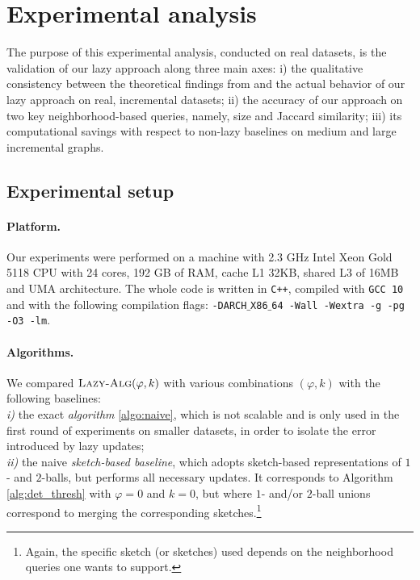 \section{Experimental analysis}\label{sec:exp}
The purpose of this experimental analysis, conducted on real datasets, is the validation of our lazy approach along three main axes: i) the qualitative consistency between the theoretical findings from  and the actual behavior of our lazy approach on real, incremental datasets;
ii) the accuracy of our approach on two key neighborhood-based queries, namely, size and Jaccard similarity;  iii) its computational savings with respect to non-lazy baselines on medium and large incremental graphs.

\subsection{Experimental setup}
\paragraph{Platform.} Our experiments were performed on a machine with 2.3 GHz Intel Xeon Gold 5118 CPU with 24 cores, 192 GB of RAM, cache L1 32KB, shared L3 of 16MB and UMA architecture. The whole code is written in \texttt{C++}, compiled with \texttt{GCC 10} and with the following compilation flags: \texttt{-DARCH$\_$X86$\_$64 -Wall -Wextra -g -pg -O3 -lm}.

\paragraph{Algorithms.}
We compared $\textsc{Lazy-Alg}(\varphi, k)$ with various combinations $(\varphi, k)$ with  the following baselines: \\
\textit{i)} the exact \textit{algorithm} \ref{algo:naive}, which is not scalable and is only used in the first round of experiments on smaller datasets, in order to isolate the error introduced by lazy updates; \\
\textit{ii)} the naive \textit{sketch-based baseline}, which adopts sketch-based representations of $1$- and $2$-balls, but performs all necessary updates. It corresponds to Algorithm \ref{alg:det_thresh} with $\varphi = 0$ and $k = 0$, but where $1$- and/or $2$-ball unions correspond to merging the corresponding sketches.\footnote{Again, the specific sketch (or sketches) used depends on the neighborhood queries one wants to support.}

